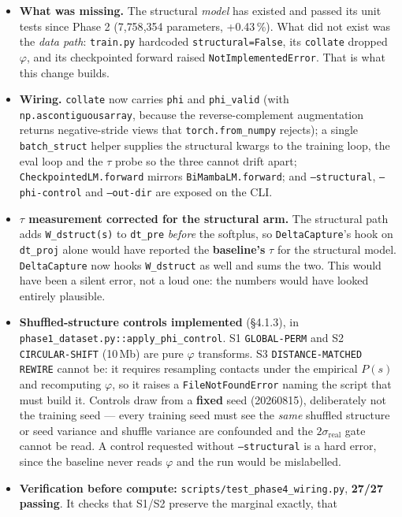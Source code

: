 \documentclass[11pt,a4paper]{article}
\newcommand{\code}[1]{\texttt{\small #1}}
\begin{document}
\begin{itemize}
\item \textbf{What was missing.} The structural \emph{model} has existed and
passed its unit tests since Phase 2 (7{,}758{,}354 parameters, +0.43\,\%). What
did not exist was the \emph{data path}: \code{train.py} hardcoded
\code{structural=False}, its \code{collate} dropped $\varphi$, and its
checkpointed forward raised \code{NotImplementedError}. That is what this change
builds.
\item \textbf{Wiring.} \code{collate} now carries \code{phi} and
\code{phi\_valid} (with \code{np.ascontiguousarray}, because the
reverse-complement augmentation returns negative-stride views that
\code{torch.from\_numpy} rejects); a single \code{batch\_struct} helper supplies
the structural kwargs to the training loop, the eval loop and the $\tau$ probe so
the three cannot drift apart; \code{CheckpointedLM.forward} mirrors
\code{BiMambaLM.forward}; and \code{--structural}, \code{--phi-control} and
\code{--out-dir} are exposed on the CLI.
\item \textbf{$\tau$ measurement corrected for the structural arm.} The
structural path adds \code{W\_dstruct(s)} to \code{dt\_pre} \emph{before} the
softplus, so \code{DeltaCapture}'s hook on \code{dt\_proj} alone would have
reported the \textbf{baseline's} $\tau$ for the structural model. \code{DeltaCapture}
now hooks \code{W\_dstruct} as well and sums the two. This would have been a
silent error, not a loud one: the numbers would have looked entirely plausible.
\item \textbf{Shuffled-structure controls implemented} (\S4.1.3), in
\code{phase1\_dataset.py::apply\_phi\_control}. S1 \code{GLOBAL-PERM} and S2
\code{CIRCULAR-SHIFT} (10\,Mb) are pure $\varphi$ transforms. S3
\code{DISTANCE-MATCHED REWIRE} cannot be: it requires resampling contacts under
the empirical $P(s)$ and recomputing $\varphi$, so it raises a
\code{FileNotFoundError} naming the script that must build it. Controls draw
from a \textbf{fixed} seed (20260815), deliberately not the training seed ---
every training seed must see the \emph{same} shuffled structure or seed variance
and shuffle variance are confounded and the $2\sigma_{\mathrm{real}}$ gate cannot
be read. A control requested without \code{--structural} is a hard error, since
the baseline never reads $\varphi$ and the run would be mislabelled.
\item \textbf{Verification before compute:} \code{scripts/test\_phase4\_wiring.py},
\textbf{27/27 passing}. It checks that S1/S2 preserve the marginal exactly, that

\end{itemize}
\end{document}
